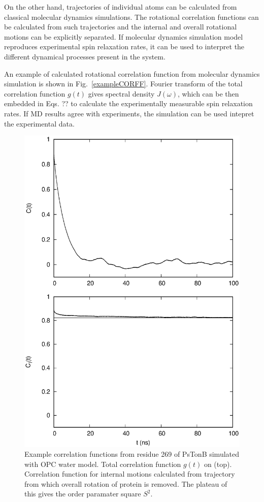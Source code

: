 \documentclass[pre,aps,floatfix,authordate1-4]{revtex4-1}
\begin{document}
On the other hand, trajectories of individual atoms can be calculated
from classical molecular dynamics simulations. The rotational
correlation functions can be calculated from such trajectories and
the internal and overall rotational motions can be explicitly
separated. If molecular dynamics simulation model reproduces
experimental spin relaxation rates, it can be used to interpret
the different dynamical processes present in the system.

An example of calculated rotational correlation function from
molecular dynamics simulation is shown in Fig.~\ref{exampleCORFF}.
Fourier transform of the total correlation function $g(t)$ gives
spectral density $J(\omega)$, which can be then embedded in Eqs. ??
to calculate the experimentally measurable spin relaxation rates.
If MD results agree with experiments, the simulation can be used
intepret the experimental data.
\begin{figure}[!h]
  \includegraphics[width=13cm]{../Figs/exampleCORRF.eps}%
  \caption{Example correlation functions from residue 269 of PsTonB simulated with OPC water model.
    Total correlation function $g(t)$ on (top). Correlation function for internal motions
    calculated from trajectory from which overall rotation of protein is removed.
    The plateau of this gives the order paramater square $S^2$.
    \label{exampleCORRF}}%
\end{figure}
\end{document}
